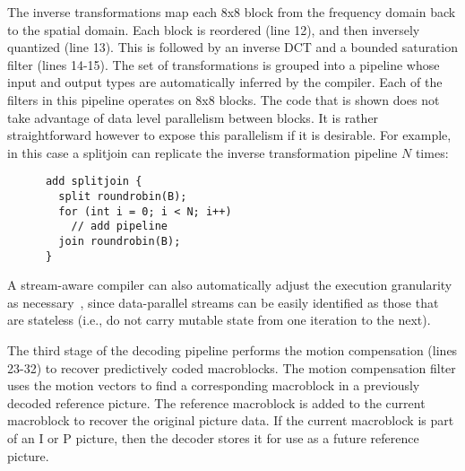 The inverse transformations map each 8x8 block from the frequency
domain back to the spatial domain. Each block is reordered
(line 12), and then inversely quantized (line 13). This is followed by
an inverse DCT and a bounded saturation filter (lines 14-15). The set
of transformations is grouped into a pipeline whose input
and output types are automatically inferred by the compiler. Each of
the filters in this pipeline operates on 8x8 blocks. The code that is
shown does not take advantage of data level parallelism between
blocks. It is rather straightforward however to expose this
parallelism if it is desirable. For example, in this case a splitjoin
can replicate the inverse transformation pipeline $N$ times:
\begin{center}
  \begin{scriptsize}
    \begin{verbatim}
      add splitjoin {
        split roundrobin(B);
        for (int i = 0; i < N; i++) 
          // add pipeline
        join roundrobin(B);
      }
    \end{verbatim}
  \end{scriptsize}
\end{center}
\vspace{-12pt}
A stream-aware compiler can also automatically adjust the execution
granularity as necessary~\cite{gordon02asplos}, since data-parallel streams
can be easily identified as those that are stateless (i.e., do not
carry mutable state from one iteration to the next).

The third stage of the decoding pipeline performs the motion
compensation (lines 23-32) to recover predictively coded
macroblocks. The motion compensation filter uses the motion vectors to
find a corresponding macroblock in a previously decoded reference
picture. The reference macroblock is added to the current macroblock
to recover the original picture data. If the current macroblock is
part of an I or P picture, then the decoder stores it for use as a
future reference picture.

